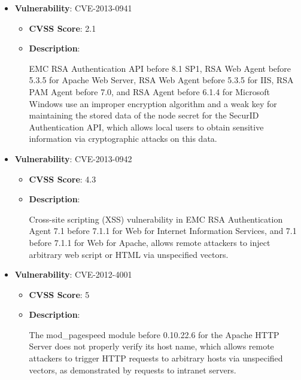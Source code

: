 \documentclass{article}
\begin{document}
\begin{itemize}
    
        \item \textbf{Vulnerability}: CVE-2013-0941
        \begin{itemize}
            \item \textbf{CVSS Score}:  2.1 
            \item \textbf{Description}:
            \parbox[t]{0.9\linewidth}{
                \ttfamily EMC RSA Authentication API before 8.1 SP1, RSA Web Agent before 5.3.5 for Apache Web Server, RSA Web Agent before 5.3.5 for IIS, RSA PAM Agent before 7.0, and RSA Agent before 6.1.4 for Microsoft Windows use an improper encryption algorithm and a weak key for maintaining the stored data of the node secret for the SecurID Authentication API, which allows local users to obtain sensitive information via cryptographic attacks on this data.
            }
        \end{itemize}
    
        \item \textbf{Vulnerability}: CVE-2013-0942
        \begin{itemize}
            \item \textbf{CVSS Score}:  4.3 
            \item \textbf{Description}:
            \parbox[t]{0.9\linewidth}{
                \ttfamily Cross-site scripting (XSS) vulnerability in EMC RSA Authentication Agent 7.1 before 7.1.1 for Web for Internet Information Services, and 7.1 before 7.1.1 for Web for Apache, allows remote attackers to inject arbitrary web script or HTML via unspecified vectors.
            }
        \end{itemize}
    
        \item \textbf{Vulnerability}: CVE-2012-4001
        \begin{itemize}
            \item \textbf{CVSS Score}:  5 
            \item \textbf{Description}:
            \parbox[t]{0.9\linewidth}{
                \ttfamily The mod\_pagespeed module before 0.10.22.6 for the Apache HTTP Server does not properly verify its host name, which allows remote attackers to trigger HTTP requests to arbitrary hosts via unspecified vectors, as demonstrated by requests to intranet servers.
            }
        \end{itemize}
    

\end{itemize}
\end{document}
